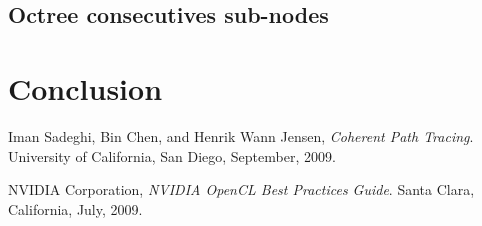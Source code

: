 \documentclass[10pt,twocolumn,a4paper]{article}
\begin{document}
\subsection{Octree consecutives sub-nodes}



\section{Conclusion}




\begin{thebibliography}{9}

    Iman Sadeghi, Bin Chen, and Henrik Wann Jensen,
    \emph{Coherent Path Tracing}.
    University of California, San Diego,
    September, 2009.

    NVIDIA Corporation,
    \emph{NVIDIA OpenCL Best Practices Guide}.
    Santa Clara, California,
    July, 2009.

\end{thebibliography}
\end{document}
